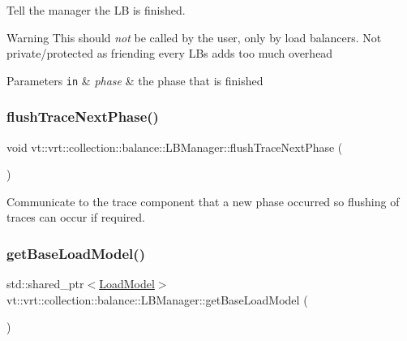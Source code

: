 Tell the manager the LB is finished. 

\begin{DoxyWarning}{Warning}
This should {\itshape not} be called by the user, only by load balancers. Not private/protected as friending every L\+Bs adds too much overhead
\end{DoxyWarning}

\begin{DoxyParams}[1]{Parameters}
\mbox{\tt in}  & {\em phase} & the phase that is finished \\
\hline
\end{DoxyParams}
\mbox{\label{structvt_1_1vrt_1_1collection_1_1balance_1_1_l_b_manager_a5d22a62d49f296b4e77166667ed780d8}} 
\subsubsection{\texorpdfstring{flush\+Trace\+Next\+Phase()}{flushTraceNextPhase()}}
{\footnotesize\ttfamily void vt\+::vrt\+::collection\+::balance\+::\+L\+B\+Manager\+::flush\+Trace\+Next\+Phase (\begin{DoxyParamCaption}{ }\end{DoxyParamCaption})}



Communicate to the trace component that a new phase occurred so flushing of traces can occur if required. 

\mbox{\label{structvt_1_1vrt_1_1collection_1_1balance_1_1_l_b_manager_a9822187c2745a7b3b9c4a5929f8e3cc4}} 
\subsubsection{\texorpdfstring{get\+Base\+Load\+Model()}{getBaseLoadModel()}}
{\footnotesize\ttfamily std\+::shared\+\_\+ptr$<$\hyperlink{classvt_1_1vrt_1_1collection_1_1balance_1_1_load_model}{Load\+Model}$>$ vt\+::vrt\+::collection\+::balance\+::\+L\+B\+Manager\+::get\+Base\+Load\+Model (\begin{DoxyParamCaption}{ }\end{DoxyParamCaption})\hspace{0.3cm}{\ttfamily [inline]}}



